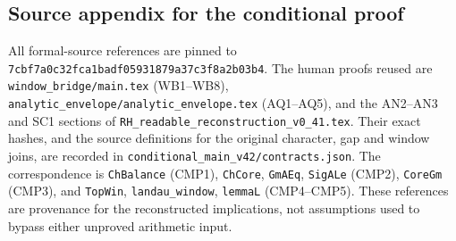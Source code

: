 \subsection{Source appendix for the conditional proof}

All formal-source references are pinned to
\texttt{7cbf7a0c32fca1badf05931879a37c3f8a2b03b4}.
The human proofs reused are
\texttt{window\_bridge/main.tex} (WB1--WB8),
\texttt{analytic\_envelope/analytic\_envelope.tex} (AQ1--AQ5),
and the AN2--AN3 and SC1 sections of
\texttt{RH\_readable\_reconstruction\_v0\_41.tex}.
Their exact hashes, and the source definitions for the original
character, gap and window joins, are recorded in
\texttt{conditional\_main\_v42/contracts.json}.
The correspondence is
\texttt{ChBalance} (CMP1),
\texttt{ChCore}, \texttt{GmAEq}, \texttt{SigALe} (CMP2),
\texttt{CoreGm} (CMP3), and
\texttt{TopWin}, \texttt{landau\_window}, \texttt{lemmaL}
(CMP4--CMP5).  These references are provenance for the
reconstructed implications, not assumptions used to bypass either
unproved arithmetic input.
